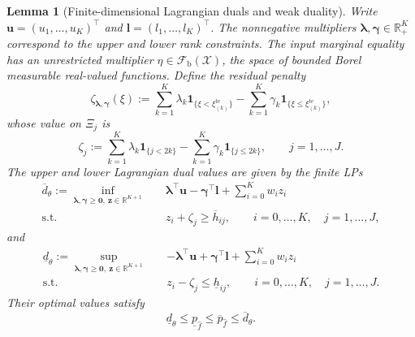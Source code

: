 \documentclass[review,11pt,3p,authoryear,nopreprintline]{elsarticle}
\newtheorem{lemma}{Lemma}
\begin{document}
\begin{lemma}[Finite-dimensional Lagrangian duals and weak duality]
  \label{lem-weak-duality}
  Write $\bm u=(u_1,\ldots,u_K)^\top$ and $\bm l=(l_1,\ldots,l_K)^\top$. The nonnegative multipliers $\bm\lambda,\bm\gamma\in\mathbb R_+^K$ correspond to the upper and lower rank constraints. The input marginal equality has an unrestricted multiplier $\eta\in\mathcal F_{\mathrm b}(\mathcal X)$, the space of bounded Borel measurable real-valued functions. Define the residual penalty
  \begin{equation}
    \zeta_{\bm\lambda,\bm\gamma}(\xi)
    :=\sum_{k=1}^{K}\lambda_k\mathbf1_{\{\xi<\xi_{(k)}^{\mathrm{te}}\}}
      -\sum_{k=1}^{K}\gamma_k\mathbf1_{\{\xi\le\xi_{(k)}^{\mathrm{te}}\}},
    \label{eq-dual-step-function}
  \end{equation}
  whose value on $\Xi_j$ is
  \begin{equation}
    \zeta_j:=\sum_{k=1}^{K}\lambda_k\mathbf1_{\{j<2k\}}
      -\sum_{k=1}^{K}\gamma_k\mathbf1_{\{j\le2k\}},
    \qquad j=1,\ldots,J.
    \label{eq-dual-cell-values}
  \end{equation}
  The upper and lower Lagrangian dual values are given by the finite LPs
  \begin{equation}
    \begin{aligned}
      \overline d_\theta
      :=\inf_{\bm\lambda,\bm\gamma\ge\bm0,\ \bm z\in\mathbb R^{K+1}}\quad&
        \bm\lambda^\top\bm u-\bm\gamma^\top\bm l+\sum_{i=0}^{K}w_i z_i\\
      \text{s.t.}\quad&z_i+\zeta_j\ge\overline h_{ij},
        \qquad i=0,\ldots,K,\quad j=1,\ldots,J,
    \end{aligned}
    \label{eq-finite-upper-dual}
  \end{equation}
  and
  \begin{equation}
    \begin{aligned}
      \underline d_\theta
      :=\sup_{\bm\lambda,\bm\gamma\ge\bm0,\ \bm z\in\mathbb R^{K+1}}\quad&
        -\bm\lambda^\top\bm u+\bm\gamma^\top\bm l+\sum_{i=0}^{K}w_i z_i\\
      \text{s.t.}\quad&z_i-\zeta_j\le\underline h_{ij},
        \qquad i=0,\ldots,K,\quad j=1,\ldots,J.
    \end{aligned}
    \label{eq-finite-lower-dual}
  \end{equation}
  Their optimal values satisfy
  \begin{equation}
    \underline d_\theta\le\underline p_{\hat f}
      \le\overline p_{\hat f}\le\overline d_\theta.
    \label{eq-weak-duality}
  \end{equation}
\end{lemma}
\end{document}
